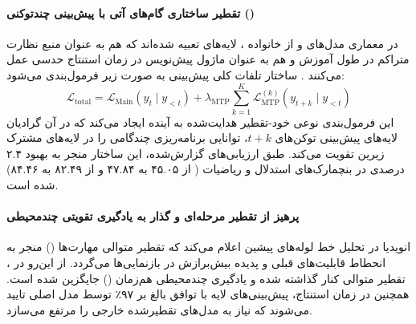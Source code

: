 \item {}

\paragraph*{تقطیر ساختاری گام‌های آتی با پیش‌بینی چندتوکنی ()}
در معماری مدل‌های  و  از خانواده ، لایه‌های  تعبیه شده‌اند که هم به عنوان منبع نظارت متراکم در طول آموزش و هم به عنوان ماژول پیش‌نویس در زمان استنتاج حدسی عمل می‌کنند \cite{nemotron2025v3}. ساختار تلفات کلی پیش‌بینی به صورت زیر فرمول‌بندی می‌شود:
\begin{equation}
    \mathcal{L}_{\mathrm{total}} = \mathcal{L}_{\mathrm{Main}}(y_t \mid y_{<t}) + \lambda_{\mathrm{MTP}} \sum_{k=1}^K \mathcal{L}_{\mathrm{MTP}}^{(k)}(y_{t+k} \mid y_{<t})
\end{equation}
این فرمول‌بندی نوعی خود-تقطیر هدایت‌شده به آینده ایجاد می‌کند که در آن گرادیان لایه‌های پیش‌بینی توکن‌های $t+k$، توانایی برنامه‌ریزی چندگامی را در لایه‌های مشترک زیرین تقویت می‌کند. طبق ارزیابی‌های گزارش‌شده، این ساختار منجر به بهبود ۲.۴ درصدی در بنچمارک‌های استدلال و ریاضیات ( از ۴۵.۰۵ به ۴۷.۸۴ و  از ۸۲.۴۹ به ۸۴.۴۶) شده است.

\paragraph*{پرهیز از تقطیر مرحله‌ای و گذار به یادگیری تقویتی چندمحیطی}
انویدیا در تحلیل خط لوله‌های پیشین اعلام می‌کند که تقطیر متوالی مهارت‌ها () منجر به انحطاط قابلیت‌های قبلی و پدیده بیش‌برازش در بازنمایی‌ها می‌گردد. از این‌رو در ، تقطیر متوالی کنار گذاشته شده و یادگیری چندمحیطی هم‌زمان () جایگزین شده است. همچنین در زمان استنتاج، پیش‌بینی‌های لایه  با توافق بالغ بر ۹۷٪ توسط مدل اصلی تایید می‌شوند که نیاز به مدل‌های تقطیرشده خارجی را مرتفع می‌سازد.

